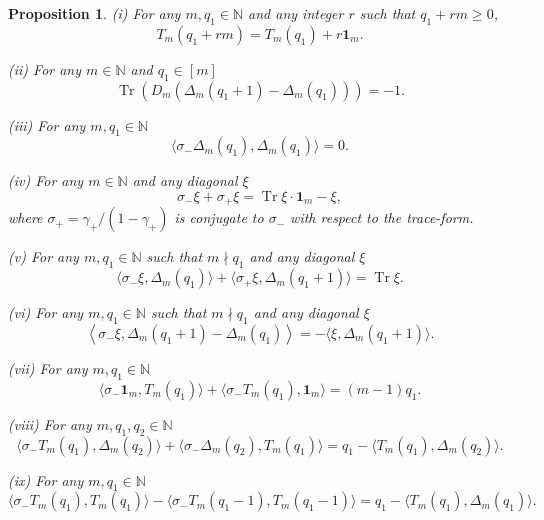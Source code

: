 \documentclass{amsart}
\newtheorem{proposition}[theorem]{Proposition}
\theoremstyle{definition}
\theoremstyle{remark}
\numberwithin{equation}{section}
\numberwithin{theorem}{section}
\begin{document}
\begin{proposition}\label{identities}
{\rm (i)} For any $m, q_1\in{\mathbb N}$ and any integer $r$ such that $q_1+rm\ge 0$,
\begin{equation}\label{Tshift}
 T_m(q_1+rm)=T_m(q_1)+r{\mathbf 1}_m.
\end{equation}

{\rm (ii)} For any $m\in {\mathbb N}$ and $q_1\in [m]$ 
\begin{equation}\label{idty0}
 {\operatorname{Tr}}\left(D_m(\Delta_m(q_1+1)-\Delta_m(q_1))\right)=-1.
\end{equation}
 
 {\rm (iii)} For any $m, q_1\in {\mathbb N}$
\begin{equation}\label{idty1}
 \langle\sigma_-\Delta_m(q_1),\Delta_m(q_1)\rangle=0.
 \end{equation}

 {\rm (iv)} For any $m\in {\mathbb N}$ and any diagonal $\xi$
 \begin{equation}\label{idty2}
  \sigma_-\xi+\sigma_+\xi={\operatorname{Tr}}\xi\cdot{\mathbf 1}_m-\xi,
 \end{equation}
where $\sigma_+=\gamma_+/(1-\gamma_+)$ is conjugate to $\sigma_-$ with respect to the trace-form.
 
 {\rm (v)}  For any $m, q_1\in {\mathbb N}$ such that $m\nmid q_1$ and any diagonal $\xi$
 \begin{equation}\label{idty7}
  \langle\sigma_-\xi, \Delta_m(q_1)\rangle+
  \langle\sigma_+\xi, \Delta_m(q_1+1)\rangle
  ={\operatorname{Tr}}\xi.
 \end{equation}
 
 {\rm (vi)} For any $m, q_1\in {\mathbb N}$ such that $m\nmid q_1$ and any diagonal $\xi$
 \begin{equation}\label{idty6}
  \left\langle\sigma_-\xi,\Delta_m(q_1+1)-\Delta_m(q_1)\right\rangle=-\langle \xi, \Delta_m(q_1+1)\rangle.
 \end{equation}
 
  {\rm (vii)} For any $m, q_1\in {\mathbb N}$
 \begin{equation}\label{idty3}
  \langle\sigma_-{\mathbf 1}_m,T_m(q_1)\rangle+\langle\sigma_-T_m(q_1),{\mathbf 1}_m\rangle=(m-1)q_1.
 \end{equation}

 {\rm (viii)}
 For any $m, q_1, q_2\in {\mathbb N}$
 \begin{equation}\label{idty4}
  \langle\sigma_-T_m(q_1),\Delta_m(q_2)\rangle+\langle\sigma_-\Delta_m(q_2), T_m(q_1)\rangle
  =q_1-\langle T_m(q_1), \Delta_m(q_2)\rangle.
 \end{equation}

 {\rm (ix)} For any $m, q_1\in {\mathbb N}$
 \begin{equation}\label{idty5}
  \langle\sigma_-T_m(q_1),T_m(q_1)\rangle-\langle\sigma_-T_m(q_1-1),T_m(q_1-1)\rangle=
  q_1-\langle T_m(q_1), \Delta_m(q_1)\rangle.
 \end{equation}
 \end{proposition}
\end{document}
